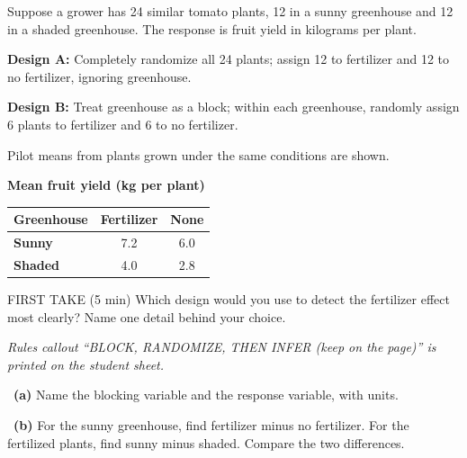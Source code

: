 \documentclass[11pt]{article}
\begin{document}
Suppose a grower has 24 similar tomato plants, 12 in a sunny greenhouse and 12 in a shaded greenhouse. The response is fruit yield in kilograms per plant.\par\smallskip \textbf{Design A:} Completely randomize all 24 plants; assign 12 to fertilizer and 12 to no fertilizer, ignoring greenhouse.\par \textbf{Design B:} Treat greenhouse as a block; within each greenhouse, randomly assign 6 plants to fertilizer and 6 to no fertilizer.\par\smallskip Pilot means from plants grown under the same conditions are shown.\par
\begin{center}
\textbf{Mean fruit yield (kg per plant)}\par\smallskip
\begin{tabular}{|l|c|c|}
\hline
\textbf{Greenhouse} & \textbf{Fertilizer} & \textbf{None} \\ \hline
\textbf{Sunny} & 7.2 & 6.0 \\ \hline
\textbf{Shaded} & 4.0 & 2.8 \\ \hline
\end{tabular}
\end{center}
\begin{firsttakebox}{FIRST TAKE (5 min)}
Which design would you use to detect the fertilizer effect most clearly? Name one detail behind your choice.\par
{}
\end{firsttakebox}

\textit{Rules callout ``BLOCK, RANDOMIZE, THEN INFER (keep on the page)'' is printed on the student sheet.}\par\medskip

~\textbf{(a)} Name the blocking variable and the response variable, with units.\par
{}

~\textbf{(b)} For the sunny greenhouse, find fertilizer minus no fertilizer. For the fertilized plants, find sunny minus shaded. Compare the two differences.\par
{}
\end{document}
